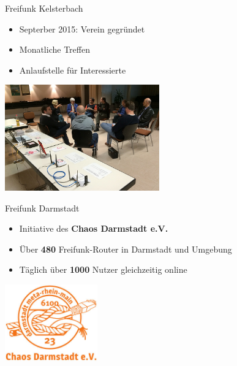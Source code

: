 \documentclass[t]{beamer}
\begin{document}
  \begin{frame}{Freifunk Kelsterbach}
    \begin{itemize}
      \item Septerber 2015: Verein gegründet
      \item Monatliche Treffen
      \item Anlaufstelle für Interessierte
    \end{itemize}
    \begin{center}
      \vspace{1em}
      \includegraphics[width=0.5\textwidth]{images/ffkelsterbach-infoveranstaltung}
    \end{center}
  \end{frame}

  \begin{frame}{Freifunk Darmstadt}
    \begin{itemize}
      \item Initiative des \textbf{Chaos Darmstadt e.V.}
      \item Über \textbf{480} Freifunk-Router in Darmstadt und Umgebung
      \item Täglich über \textbf{1000} Nutzer gleichzeitig online
    \end{itemize}
    \begin{center}
      \vspace{1em}
      \includegraphics[width=0.3\textwidth]{images/cda_transparent}
    \end{center}
  \end{frame}
\end{document}
